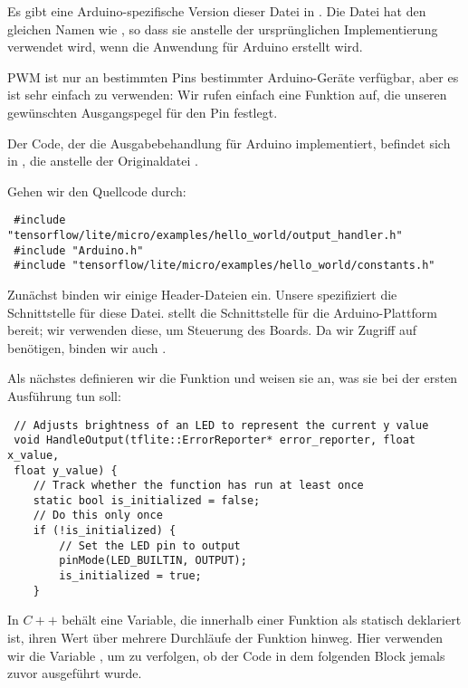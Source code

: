  
Es gibt eine Arduino-spezifische Version dieser Datei in . Die Datei hat den gleichen Namen wie , so dass sie anstelle der ursprünglichen Implementierung verwendet wird, wenn die Anwendung für Arduino erstellt wird.


PWM ist nur an bestimmten Pins bestimmter Arduino-Geräte verfügbar, aber es ist sehr einfach zu verwenden: Wir rufen einfach eine Funktion auf, die unseren gewünschten Ausgangspegel für den Pin festlegt.
 
 
     
 Der Code, der die Ausgabebehandlung für Arduino implementiert, befindet sich in , die anstelle der Originaldatei   .
 
 Gehen wir den Quellcode durch:
 
\begin{lstlisting}
 #include "tensorflow/lite/micro/examples/hello_world/output_handler.h"
 #include "Arduino.h"
 #include "tensorflow/lite/micro/examples/hello_world/constants.h"
\end{lstlisting} 


 Zunächst binden wir einige Header-Dateien ein. Unsere  spezifiziert die Schnittstelle für diese Datei.  stellt die Schnittstelle für die Arduino-Plattform bereit; wir verwenden diese, um Steuerung des Boards. Da wir Zugriff auf  benötigen, binden wir auch .
 
Als nächstes definieren wir die Funktion und weisen sie an, was sie bei der ersten Ausführung tun soll:

\begin{lstlisting}
 // Adjusts brightness of an LED to represent the current y value
 void HandleOutput(tflite::ErrorReporter* error_reporter, float x_value,
 float y_value) {
 	// Track whether the function has run at least once
 	static bool is_initialized = false;
 	// Do this only once
 	if (!is_initialized) {
 		// Set the LED pin to output
 		pinMode(LED_BUILTIN, OUTPUT);
 		is_initialized = true;
 	}
\end{lstlisting} 
 
 
In $C++$ behält eine Variable, die innerhalb einer Funktion als statisch deklariert ist, ihren Wert über mehrere Durchläufe der Funktion hinweg. Hier verwenden wir die Variable , um zu verfolgen, ob der Code in dem  folgenden Block  jemals zuvor ausgeführt wurde.
     
